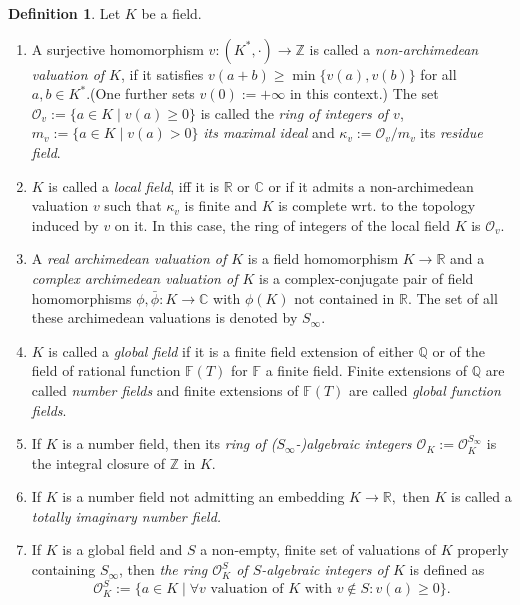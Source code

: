\documentclass[12pt]{amsart}
\theoremstyle{definition}\newtheorem{definition}[theorem]{Definition}
\theoremstyle{remark}\newtheorem{remark}[theorem]{Remark}
\theoremstyle{definition}\newtheorem{case}{Case}
\begin{document}
\begin{definition}
Let $K$ be a field.
\begin{enumerate}
\item A surjective homomorphism $v:(K^*,\cdot)\to\mathbb{Z}$ is called a \textit{non-archimedean valuation of $K$}, if it satisfies $v(a+b)\geq\min\{v(a),v(b)\}$ for all $a,b\in K^*$.(One further sets $v(0):=+\infty$ in this context.) The set $\mathscr{O}_v:=\{a\in K\mid v(a)\geq 0\}$ is called the \emph{ring of integers of $v$}, $m_v:=\{a\in K\mid v(a)>0\}$ \emph{its maximal ideal} and $\kappa_v:=\mathscr{O}_v/m_v$ its \emph{residue field}.
\item $K$ is called a \emph{local field}, iff it is $\mathbb{R}$ or $\mathbb{C}$ or if it admits a non-archimedean valuation $v$ such that $\kappa_v$ is finite and $K$ is complete wrt. to the topology induced by $v$ on it. In this case, the ring of integers of the local field $K$ is $\mathscr{O}_v.$
\item A \textit{real archimedean valuation of $K$} is a field homomorphism $K\to\mathbb{R}$ and a \emph{complex archimedean valuation of $K$} is a complex-conjugate pair of field homomorphisms $\phi,\bar{\phi}:K\to\mathbb{C}$ with $\phi(K)$ not contained in $\mathbb{R}.$ The set of all these archimedean valuations is denoted by $S_{\infty}.$
\item $K$ is called a \emph{global field} if it is a finite field extension of either $\mathbb{Q}$ or of the field of rational function $\mathbb{F}(T)$ for $\mathbb{F}$ a finite field. Finite extensions of $\mathbb{Q}$ are called \emph{number fields} and finite extensions of $\mathbb{F}(T)$ are called \emph{global function fields}.
\item If $K$ is a number field, then its \emph{ring of ($S_{\infty}$-)algebraic integers $\mathscr{O}_K:=\mathscr{O}_K^{S_{\infty}}$} is the integral closure of $\mathbb{Z}$ in $K.$ 
\item If $K$ is a number field not admitting an embedding $K\to\mathbb{R},$ then $K$ is called a \emph{totally imaginary number field.}
\item If $K$ is a global field and $S$ a non-empty, finite set of valuations of $K$ properly containing $S_{\infty}$, then \emph{the ring $\mathscr{O}_K^S$ of $S$-algebraic integers of $K$} is defined as 
\[
\mathscr{O}_K^S:=\{a\in K\mid\forall v\text{ valuation of }K\text{ with }v\notin S:v(a)\geq 0\}.
\]
\end{enumerate}
\end{definition}
\end{document}
